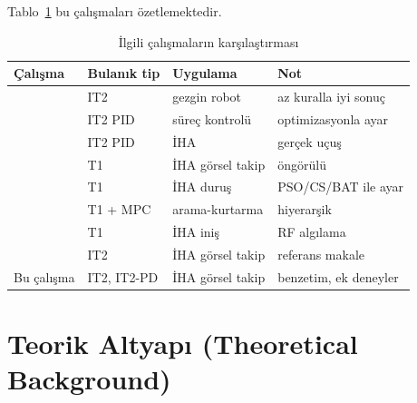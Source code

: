 \documentclass[conference,a4paper]{IEEEtran}
\begin{document}
Tablo~\ref{tab:lit} bu çalışmaları özetlemektedir.

\begin{table}[t]
\centering
\caption{İlgili çalışmaların karşılaştırması}
\label{tab:lit}
\footnotesize
\begin{tabular}{@{}p{1.6cm}p{1.6cm}p{2.0cm}p{1.9cm}@{}}
\toprule
Çalışma & Bulanık tip & Uygulama & Not \\
\midrule
\cite{hagras2004} & IT2 & gezgin robot & az kuralla iyi sonuç \\
\cite{kumbasar2014} & IT2 PID & süreç kontrolü & optimizasyonla ayar \\
\cite{sarabakha2018} & IT2 PID & İHA & gerçek uçuş \\
\cite{harik2017} & T1 & İHA görsel takip & öngörülü \\
\cite{zatout2022} & T1 & İHA duruş & PSO/CS/BAT ile ayar \\
\cite{dekoning2023} & T1 + MPC & arama-kurtarma & hiyerarşik \\
\cite{tsitses2024} & T1 & İHA iniş & RF algılama \\
\cite{li2024} & IT2 & İHA görsel takip & referans makale \\
Bu çalışma & IT2, IT2-PD & İHA görsel takip & benzetim, ek deneyler \\
\bottomrule
\end{tabular}
\end{table}

\section{Teorik Altyapı (Theoretical Background)}
\end{document}
